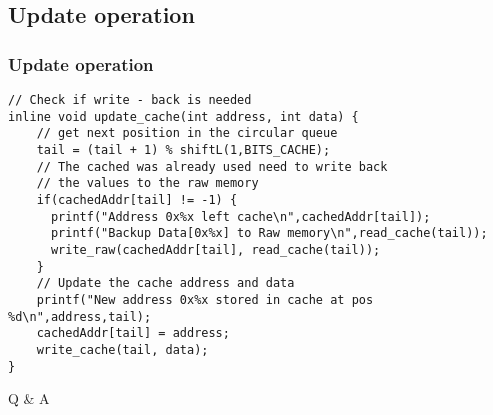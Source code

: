 \documentclass{beamer}
\begin{document}
\subsection{Update operation}
\begin{frame}[fragile]
\frametitle{Update operation}
\begin{example}
\begin{lstlisting}
// Check if write - back is needed 
inline void update_cache(int address, int data) {
    // get next position in the circular queue
    tail = (tail + 1) % shiftL(1,BITS_CACHE);
    // The cached was already used need to write back
    // the values to the raw memory
    if(cachedAddr[tail] != -1) {
      printf("Address 0x%x left cache\n",cachedAddr[tail]);
      printf("Backup Data[0x%x] to Raw memory\n",read_cache(tail));
      write_raw(cachedAddr[tail], read_cache(tail));
    }
    // Update the cache address and data
    printf("New address 0x%x stored in cache at pos %d\n",address,tail);
    cachedAddr[tail] = address;
    write_cache(tail, data);
}
\end{lstlisting}
\end{example}
\end{frame}

\begin{frame}
\Huge{\centerline{ Q \& A }}
\end{frame}
\end{document}
